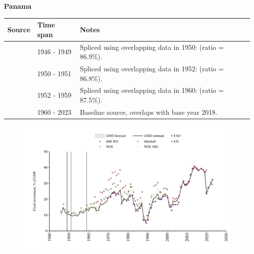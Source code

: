\documentclass[12pt,a4paper,landscape]{article}
\begin{document}
\begin{adjustbox}{max totalsize={\paperwidth}{\paperheight},center}
\begin{minipage}[t][\textheight][t]{\textwidth}
\vspace*{0.5cm}
{}
\begin{center}
{\Large\bfseries Panama}
\end{center}
\vspace{0.5cm}
\begin{table}[H]
\centering
\small
\begin{tabular}{|l|l|l|}
\hline
\textbf{Source} & \textbf{Time span} & \textbf{Notes} \\
\hline
\rowcolor{white}\cite{Mitchell}& 1946 - 1949 &Spliced using overlapping data in 1950: (ratio = 86.9\%).\\
\rowcolor{lightgray}\cite{IMF_IFS}& 1950 - 1951 &Spliced using overlapping data in 1952: (ratio = 86.8\%).\\
\rowcolor{white}\cite{Mitchell}& 1952 - 1959 &Spliced using overlapping data in 1960: (ratio = 87.5\%).\\
\rowcolor{lightgray}\cite{WDI}& 1960 - 2023 &Baseline source, overlaps with base year 2018.\\
\hline
\end{tabular}
\end{table}
\begin{figure}[H]
\centering
\includegraphics[width=\textwidth,height=0.6\textheight,keepaspectratio]{graphs/PAN_finv_GDP.pdf}
\end{figure}
\end{minipage}
\end{adjustbox}
\end{document}
